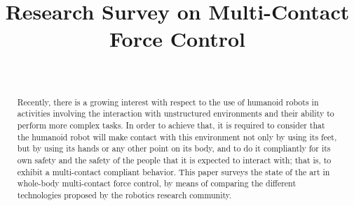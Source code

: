\documentclass[conference]{IEEEtran}
\begin{document}
	\title{\LARGE \bf Research Survey on Multi-Contact Force Control}

	\author{
		
		 \\
			
		}
  
	\maketitle

	\thispagestyle{empty}
	\pagestyle{empty}
	
	\begin{abstract}
		Recently, there is a growing interest with respect to the use of humanoid robots in activities
		involving the interaction with unstructured environments and their ability to perform more
		complex tasks.
		In order to achieve that, it is required to consider that the humanoid robot will make contact
		with this environment not only by using its feet, but by using its hands or any other point on
		its body, and to do it compliantly for its own safety and the safety of the people that it is
		expected to interact with; that is, to exhibit a multi-contact compliant behavior.
		This paper surveys the state of the art in whole-body multi-contact force control, by means
		of comparing the different technologies proposed by the robotics research	community.
	\end{abstract}
	
	

	
	
	

	
	
	
	
	
	
	
	
	
	
	
\end{document}
